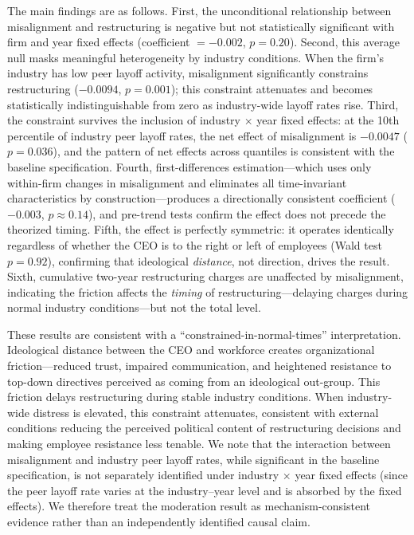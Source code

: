 The main findings are as follows. First, the unconditional relationship
between misalignment and restructuring is negative but not statistically
significant with firm and year fixed effects (coefficient $= -0.002$,
$p = 0.20$). Second, this average null masks meaningful heterogeneity
by industry conditions. When the firm's industry has low peer layoff
activity, misalignment significantly constrains restructuring
($-0.0094$, $p = 0.001$); this constraint attenuates and becomes
statistically indistinguishable from zero as industry-wide layoff rates
rise. Third, the constraint survives the inclusion of industry $\times$
year fixed effects: at the 10th percentile of industry peer layoff rates,
the net effect of misalignment is $-0.0047$ ($p = 0.036$), and the
pattern of net effects across quantiles is consistent with the baseline
specification. Fourth, first-differences estimation---which uses only
within-firm changes in misalignment and eliminates all time-invariant
characteristics by construction---produces a directionally consistent
coefficient ($-0.003$, $p \approx 0.14$), and pre-trend tests confirm
the effect does not precede the theorized timing. Fifth, the effect is
perfectly symmetric: it operates identically regardless of whether the
CEO is to the right or left of employees (Wald test $p = 0.92$),
confirming that ideological \textit{distance}, not direction, drives
the result. Sixth, cumulative two-year restructuring charges are
unaffected by misalignment, indicating the friction affects the
\textit{timing} of restructuring---delaying charges during normal
industry conditions---but not the total level.

These results are consistent with a ``constrained-in-normal-times''
interpretation. Ideological distance between the CEO and workforce
creates organizational friction---reduced trust, impaired communication,
and heightened resistance to top-down directives perceived as coming
from an ideological out-group. This friction delays restructuring during
stable industry conditions. When industry-wide distress is elevated,
this constraint attenuates, consistent with external conditions reducing
the perceived political content of restructuring decisions and making
employee resistance less tenable. We note that the interaction between
misalignment and industry peer layoff rates, while significant in the
baseline specification, is not separately identified under industry
$\times$ year fixed effects (since the peer layoff rate varies at the
industry--year level and is absorbed by the fixed effects). We therefore
treat the moderation result as mechanism-consistent evidence rather than
an independently identified causal claim.


